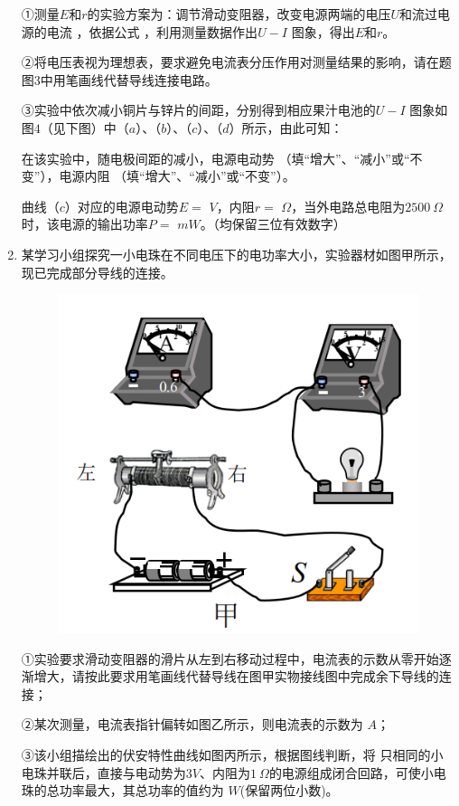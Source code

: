 \begin{enumerate}[leftmargin=0em]
①测量$ E $和$ r $的实验方案为：调节滑动变阻器，改变电源两端的电压$ U $和流过电源的电流  ，依据公式  
，利用测量数据作出$ U-I $ 图象，得出$ E $和$ r $。

②将电压表视为理想表，要求避免电流表分压作用对测量结果的影响，请在题图$ 3 $中用笔画线代替导线连接电路。 

③实验中依次减小铜片与锌片的间距，分别得到相应果汁电池的$ U-I $ 图象如图$ 4 $（见下图）中（$ a $）、（$ b $）、（$ c $）、（$ d $）所示，由此可知：
\begin{figure}[h!]
\centering

\end{figure}

在该实验中，随电极间距的减小，电源电动势  
（填“增大”、“减小”或“不变”），电源内阻  
（填“增大”、“减小”或“不变”）。

曲线（$ c $）对应的电源电动势$ E= $  
$ V $，内阻$ r= $  
$ \Omega $，当外电路总电阻为$ 2500 \ \Omega $时，该电源的输出功率$ P= $  
$ mW $。（均保留三位有效数字）



\newpage
\item 
{}
某学习小组探究一小电珠在不同电压下的电功率大小，实验器材如图甲所示，现已完成部分导线的连接。
\begin{figure}[h!]
\centering
\includegraphics[width=0.37\linewidth]{picture/screenshot013} \qquad 
 
\end{figure}



①实验要求滑动变阻器的滑片从左到右移动过程中，电流表的示数从零开始逐渐增大，请按此要求用笔画线代替导线在图甲实物接线图中完成余下导线的连接；

②某次测量，电流表指针偏转如图乙所示，则电流表的示数为  
$ A $；

③该小组描绘出的伏安特性曲线如图丙所示，根据图线判断，将  
只相同的小电珠并联后，直接与电动势为$ 3V $、内阻为$ 1 \ \Omega $的电源组成闭合回路，可使小电珠的总功率最大，其总功率的值约为  
$ W $(保留两位小数)。



\end{enumerate}
